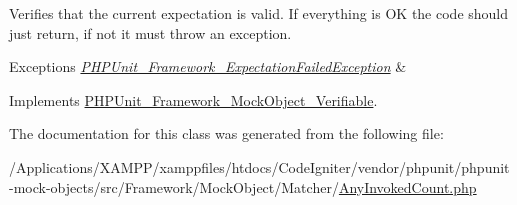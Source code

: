 Verifies that the current expectation is valid. If everything is OK the code should just return, if not it must throw an exception.


\begin{DoxyExceptions}{Exceptions}
{\em \mbox{\hyperlink{class_p_h_p_unit___framework___expectation_failed_exception}{P\+H\+P\+Unit\+\_\+\+Framework\+\_\+\+Expectation\+Failed\+Exception}}} & \\
\hline
\end{DoxyExceptions}


Implements \mbox{\hyperlink{interface_p_h_p_unit___framework___mock_object___verifiable_aa33600b6a1b28d0c4dfe4d468272aaa4}{P\+H\+P\+Unit\+\_\+\+Framework\+\_\+\+Mock\+Object\+\_\+\+Verifiable}}.



The documentation for this class was generated from the following file\+:\begin{DoxyCompactItemize}
\item 
/\+Applications/\+X\+A\+M\+P\+P/xamppfiles/htdocs/\+Code\+Igniter/vendor/phpunit/phpunit-\/mock-\/objects/src/\+Framework/\+Mock\+Object/\+Matcher/\mbox{\hyperlink{_any_invoked_count_8php}{Any\+Invoked\+Count.\+php}}\end{DoxyCompactItemize}
